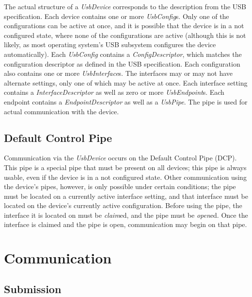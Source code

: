 \documentclass{article}
\newcommand{\myinterface}[1]{\emph{#1}}
\newcommand{\mymethod}[1]{\emph{#1}}
\begin{document}
The actual structure of a \myinterface{UsbDevice} corresponds to the description from
the USB specification.  Each device contains one or more \myinterface{UsbConfig}s.
Only one of the configurations can be active at once, and it is possible that the device
is in a not configured state, where none of the configurations are active (although this
is not likely, as most operating system's USB subsystem configures the device automatically).
Each \myinterface{UsbConfig} contains a \myinterface{ConfigDescriptor}, which matches the
configuration descriptor as defined in the USB specification.  Each configuration
also contains one or more \myinterface{UsbInterface}s.  The interfaces may or may not have
alternate settings, only one of which may be active at once.  Each interface setting
contains a \myinterface{InterfaceDescriptor} as well as zero or more \myinterface{UsbEndpoint}s.
Each endpoint contains a \myinterface{EndpointDescriptor} as well as a \myinterface{UsbPipe}.
The pipe is used for actual communication with the device.

\subsection{Default Control Pipe}

Communication via the \myinterface{UsbDevice} occurs on the Default Control Pipe (DCP).
This pipe is a special pipe that must be present on all devices; this
pipe is always usable, even if the device is in a not configured state.  Other
communication using the device's pipes, however, is only possible under certain
conditions; the pipe must be located on a currently active interface setting, and
that interface must be located on the device's currently active configuration.
Before using the pipe, the interface it is located on must be \mymethod{claim}ed,
and the pipe must be \mymethod{open}ed.  Once the interface is claimed and the
pipe is open, communication may begin on that pipe.

%

\section{Communication}

\subsection{Submission}
\end{document}
